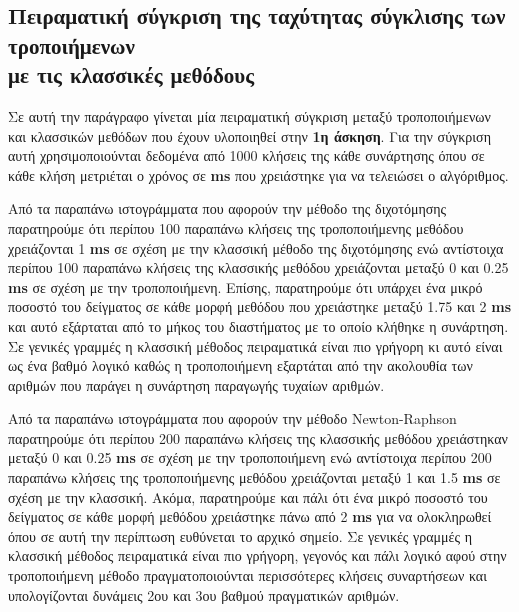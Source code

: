 \documentclass[First Project.tex]{subfiles}
\begin{document}
\subsection{Πειραματική σύγκριση της ταχύτητας σύγκλισης των τροποιήμενων \\ με τις κλασσικές μεθόδους}

Σε αυτή την παράγραφο γίνεται μία πειραματική σύγκριση μεταξύ τροποποιήμενων και κλασσικών μεθόδων που έχουν υλοποιηθεί στην 
\textbf{1η άσκηση}. Για την σύγκριση αυτή χρησιμοποιούνται δεδομένα από 1000 κλήσεις της κάθε συνάρτησης όπου σε κάθε κλήση μετριέται ο 
χρόνος σε \textlatin{\textbf{ms}} που χρειάστηκε για να τελειώσει ο αλγόριθμος.
\vspace{5mm}
\begin{figure}[h!]
    \centering
    \quad
\end{figure}

Από τα παραπάνω ιστογράμματα που αφορούν την μέθοδο της διχοτόμησης παρατηρούμε ότι περίπου 100 παραπάνω κλήσεις της τροποποιήμενης
μεθόδου χρειάζονται 1 \textlatin{\textbf{ms}} σε σχέση με την κλασσική μέθοδο της διχοτόμησης ενώ αντίστοιχα περίπου 100 παραπάνω κλήσεις 
της κλασσικής μεθόδου χρειάζονται μεταξύ 0 και 0.25 \textlatin{\textbf{ms}} σε σχέση με την τροποποιήμενη. Επίσης, παρατηρούμε ότι υπάρχει
ένα μικρό ποσοστό του δείγματος σε κάθε μορφή μεθόδου που χρειάστηκε μεταξύ 1.75 και 2 \textlatin{\textbf{ms}} και αυτό εξάρταται από το μήκος
του διαστήματος με το οποίο κλήθηκε η συνάρτηση. Σε γενικές γραμμές η κλασσική μέθοδος πειραματικά είναι πιο γρήγορη κι αυτό είναι ως ένα
βαθμό λογικό καθώς η τροποποιήμενη εξαρτάται από την ακολουθία των αριθμών που παράγει η συνάρτηση παραγωγής τυχαίων αριθμών.

\vspace{5mm}
\begin{figure}[h!]
    \centering
    \quad
\end{figure}

Από τα παραπάνω ιστογράμματα που αφορούν την μέθοδο \textlatin{Newton-Raphson} παρατηρούμε ότι περίπου 200 παραπάνω κλήσεις της κλασσικής
μεθόδου χρειάστηκαν μεταξύ 0 και 0.25 \textlatin{\textbf{ms}} σε σχέση με την τροποποιήμενη ενώ αντίστοιχα περίπου 200 παραπάνω κλήσεις
της τροποποιήμενης μεθόδου χρειάζονται μεταξύ 1 και 1.5 \textlatin{\textbf{ms}} σε σχέση με την κλασσική. Ακόμα, παρατηρούμε και πάλι ότι
ένα μικρό ποσοστό του δείγματος σε κάθε μορφή μεθόδου χρειάστηκε πάνω από 2 \textlatin{\textbf{ms}} για να ολοκληρωθεί όπου σε αυτή την 
περίπτωση ευθύνεται το αρχικό σημείο. Σε γενικές γραμμές η κλασσική μέθοδος πειραματικά είναι πιο γρήγορη, γεγονός και πάλι λογικό αφού στην
τροποποιήμενη μέθοδο πραγματοποιούνται περισσότερες κλήσεις συναρτήσεων και υπολογίζονται δυνάμεις 2ου και 3ου βαθμού πραγματικών αριθμών.
\end{document}
